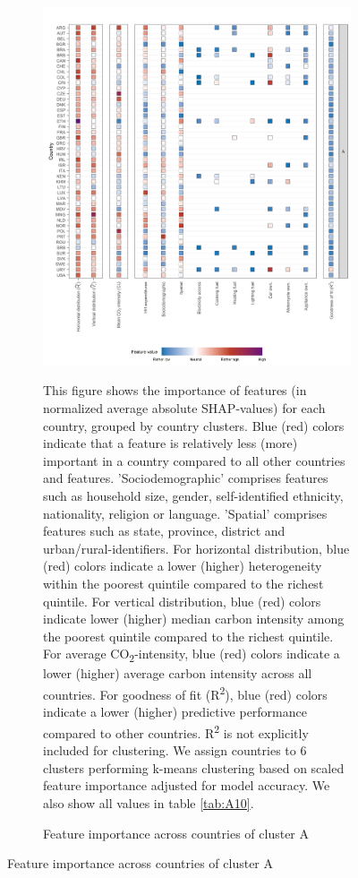 \documentclass[12pt, a4paper]{article}
\newenvironment{subcaption2}
{\strut
\vspace{-5pt}
\begin{minipage}[b]{0.95\textwidth}
  \hspace*{-\parindent}
  \footnotesize}
 {\end{minipage}}
\begin{document}
\clearpage
\begin{figure}[ht!]
    \centering
    \caption{Feature importance across countries by cluster}\label{fig:fig_4}
    \begin{subfigure}[b]{\textwidth}
    \centering
    \caption{Feature importance across countries of cluster A}\label{fig:fig_4_1}
    \includegraphics{1_Figures/Figure 4/Figure_4_Corrected_1.jpg}
     \begin{subcaption2}
    This figure shows the importance of features (in normalized average absolute SHAP-values) for each country, grouped by country clusters. Blue (red) colors indicate that a feature is relatively less (more) important in a country compared to all other countries and features. 'Sociodemographic' comprises features such as household size, gender, self-identified ethnicity, nationality, religion or language. 'Spatial' comprises features such as state, province, district and urban/rural-identifiers. For horizontal distribution, blue (red) colors indicate a lower (higher) heterogeneity within the poorest quintile compared to the richest quintile. For vertical distribution, blue (red) colors indicate lower (higher) median carbon intensity among the poorest quintile compared to the richest quintile. For average CO\textsubscript{2}-intensity, blue (red) colors indicate a lower (higher) average carbon intensity across all countries. For goodness of fit (R\textsuperscript{2}), blue (red) colors indicate a lower (higher) predictive performance compared to other countries. R\textsuperscript{2} is not explicitly included for clustering.
    We assign countries to 6 clusters performing k-means clustering based on scaled feature importance adjusted for model accuracy. We also show all values in table \ref{tab:A10}.
    \end{subcaption2}
    \end{subfigure}
\end{figure}
\end{document}
